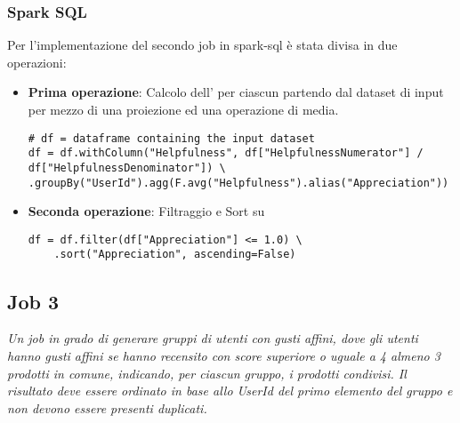   \subsubsection{Spark SQL}
  Per l'implementazione del secondo job in spark-sql è stata divisa in due operazioni:
  \begin{itemize}
    \item \textbf{Prima operazione}: Calcolo dell' per ciascun  partendo dal dataset di input per mezzo di una proiezione ed una operazione di media.
  \begin{lstlisting}[style=all, style=PythonStyle]
# df = dataframe containing the input dataset
df = df.withColumn("Helpfulness", df["HelpfulnessNumerator"] / df["HelpfulnessDenominator"]) \
.groupBy("UserId").agg(F.avg("Helpfulness").alias("Appreciation"))
  \end{lstlisting}
    \item \textbf{Seconda operazione}: Filtraggio e Sort su 
  \begin{lstlisting}[style=all, style=PythonStyle]
df = df.filter(df["Appreciation"] <= 1.0) \
    .sort("Appreciation", ascending=False)
  \end{lstlisting}
  \end{itemize}
  
\subsection{Job 3}
\textit{Un job in grado di generare gruppi di utenti con gusti affini, dove gli utenti hanno gusti affini se hanno recensito con score superiore o uguale a 4 almeno 3 prodotti in comune, indicando, per ciascun gruppo, i prodotti condivisi. Il risultato deve essere ordinato in base allo UserId del primo elemento del gruppo e non devono essere presenti duplicati.}
